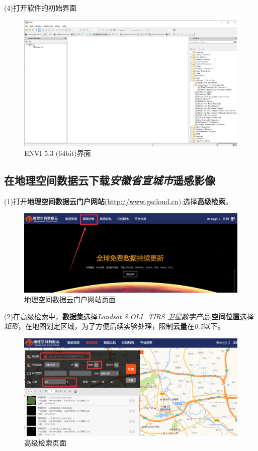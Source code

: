 \documentclass[12pt,a4paper]{article}
\begin{document}
	(4)打开软件的初始界面
	\begin{figure}[H]
		\centering
		\includegraphics[width=.7\textwidth]{all}
		\caption{ENVI 5.3 (64bit)界面}
		\label{fig:we}
	\end{figure}
	
	\subsection{在地理空间数据云下载\textit{安徽省宣城市}遥感影像}
	
	
	
	(1)打开\textbf{地理空间数据云门户网站}(\underline{http://www.gscloud.cn}),选择\textbf{高级检索}。
	\begin{figure}[H]
		\centering
		\includegraphics[width=.7\textwidth]{web}
		\caption{地理空间数据云门户网站页面}
		\label{fig:web}
	\end{figure}
	
	(2)在高级检索中，\textbf{数据集}选择\textit{Landsat 8 OLI\_TIRS 卫星数字产品},\textbf{空间位置}选择\textit{矩形}，在地图划定区域，为了方便后续实验处理，限制\textbf{云量}在\textit{0.5}以下。
	
	
	\begin{figure}[H]
		\centering
		\includegraphics[width=.7\textwidth]{web_select}
		\caption{高级检索页面}
		\label{fig:web2}
	\end{figure}
	
\end{document}
